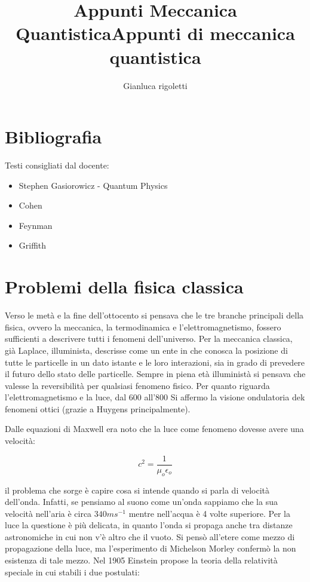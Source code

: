 \documentclass[11pt,a4paper]{article}
\author{Gianluca rigoletti}
\title{Appunti Meccanica Quantistica}
\begin{document}
\title{Appunti di meccanica quantistica}
\maketitle
\newpage

\tableofcontents

\newpage
\section{Bibliografia}
Testi consigliati dal docente:
\begin{itemize}
\item Stephen Gasiorowicz - Quantum Physics
\item Cohen
\item Feynman
\item Griffith
\end{itemize}

\section{Problemi della fisica classica}
Verso le metà e la fine dell'ottocento si pensava che le tre branche principali della fisica, ovvero la meccanica, la termodinamica e l'elettromagnetismo, fossero sufficienti a descrivere tutti i fenomeni dell'universo. Per la meccanica classica, già Laplace, illuminista, descrisse come un ente in che conosca la posizione di tutte le particelle in un dato istante e le loro interazioni, sia in grado di prevedere il futuro dello stato  delle particelle. Sempre in piena età illuministà si pensava che valesse la reversibilità per qualsiasi fenomeno fisico. Per quanto riguarda l'elettromagnetismo e la luce, dal 600 all'800 Si affermo la visione ondulatoria dek fenomeni ottici (grazie a Huygens principalmente).

Dalle equazioni di Maxwell era noto che la luce come fenomeno dovesse avere una velocità:

\begin{equation}
c^2 = \frac{1}{\mu_o \epsilon_o}
\end{equation}

il problema che sorge è capire cosa si intende quando si parla di velocità dell'onda. Infatti, se pensiamo al suono come un'onda sappiamo che la sua velocità nell'aria è circa $340 m s^{-1}$ mentre nell'acqua è 4 volte superiore. Per la luce la questione è più delicata, in quanto l'onda si propaga anche tra distanze astronomiche in cui non v'è altro che  il vuoto. Si pensò all'etere come mezzo di propagazione della luce, ma l'esperimento di Michelson Morley confermò la non esistenza di tale mezzo. Nel 1905 Einstein propose la teoria della relatività speciale in cui stabili i due postulati:
\end{document}
